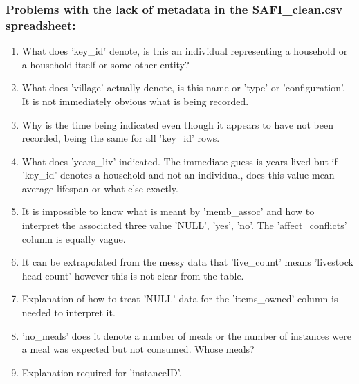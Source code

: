 \documentclass{article}
\begin{document}
\subsubsection{Problems with the lack of metadata in the SAFI\_clean.csv spreadsheet:}
\begin{enumerate}
    \item What does 'key\_id' denote, is this an individual representing a household or a household itself or some other entity?
    \item What does 'village' actually denote, is this name or 'type' or 'configuration'. It is not immediately obvious what is being recorded.
    \item Why is the time being indicated even though it appears to have not been recorded, being the same for all 'key\_id' rows.
    \item What does 'years\_liv' indicated. The immediate guess is years lived but if 'key\_id' denotes a household and not an individual, does this value mean average lifespan or what else exactly.
    \item It is impossible to know what is meant by 'memb\_assoc' and how to interpret the associated three value 'NULL', 'yes', 'no'. The 'affect\_conflicts' column is equally vague.
    \item It can be extrapolated from the messy data that 'live\_count' means 'livestock head count' however this is not clear from the table.
    \item Explanation of how to treat 'NULL' data for the 'items\_owned' column is needed to interpret it.
    \item 'no\_meals' does it denote a number of meals or the number of instances were a meal was expected but not consumed. Whose meals?
    \item Explanation required for 'instanceID'.
\end{enumerate}
\end{document}
